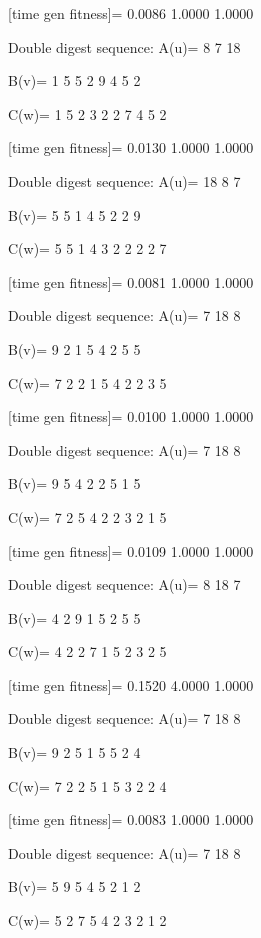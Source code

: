 [time gen fitness]=
    0.0086    1.0000    1.0000

Double digest sequence:
A(u)=
     8     7    18

B(v)=
     1     5     5     2     9     4     5     2

C(w)=
     1     5     2     3     2     2     7     4     5     2

[time gen fitness]=
    0.0130    1.0000    1.0000

Double digest sequence:
A(u)=
    18     8     7

B(v)=
     5     5     1     4     5     2     2     9

C(w)=
     5     5     1     4     3     2     2     2     2     7

[time gen fitness]=
    0.0081    1.0000    1.0000

Double digest sequence:
A(u)=
     7    18     8

B(v)=
     9     2     1     5     4     2     5     5

C(w)=
     7     2     2     1     5     4     2     2     3     5

[time gen fitness]=
    0.0100    1.0000    1.0000

Double digest sequence:
A(u)=
     7    18     8

B(v)=
     9     5     4     2     2     5     1     5

C(w)=
     7     2     5     4     2     2     3     2     1     5

[time gen fitness]=
    0.0109    1.0000    1.0000

Double digest sequence:
A(u)=
     8    18     7

B(v)=
     4     2     9     1     5     2     5     5

C(w)=
     4     2     2     7     1     5     2     3     2     5

[time gen fitness]=
    0.1520    4.0000    1.0000

Double digest sequence:
A(u)=
     7    18     8

B(v)=
     9     2     5     1     5     5     2     4

C(w)=
     7     2     2     5     1     5     3     2     2     4

[time gen fitness]=
    0.0083    1.0000    1.0000

Double digest sequence:
A(u)=
     7    18     8

B(v)=
     5     9     5     4     5     2     1     2

C(w)=
     5     2     7     5     4     2     3     2     1     2

